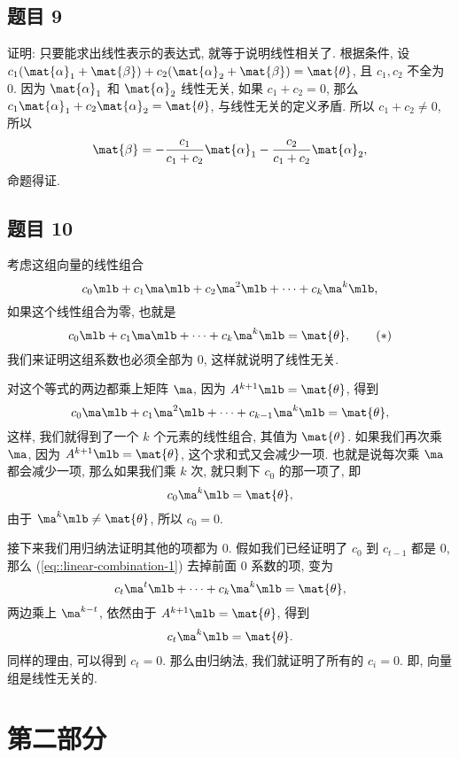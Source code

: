 \subsection*{ 题目 9 }
\begin{solution}
证明: 只要能求出线性表示的表达式, 就等于说明线性相关了. 根据条件, 设 $c_1 (\mat{\alpha}_1 + \mat{\beta}) + c_2 (\mat{\alpha}_2 + \mat{\beta}) = \mat{\theta}$, 且 $c_1, c_2$ 不全为 $0$. 因为 $\mat{\alpha}_1$ 和 $\mat{\alpha}_2$ 线性无关, 如果 $c_1 + c_2 = 0$, 那么 $c_1 \mat{\alpha}_1 + c_2 \mat{\alpha}_2 = \mat{\theta}$, 与线性无关的定义矛盾. 所以 $c_1 + c_2 \not= 0$, 所以
\[
\mat{\beta} = -\frac{c_1}{c_1 + c_2}\mat{\alpha}_1 - \frac{c_2}{c_1 + c_2}\mat{\alpha}_2,
\]
命题得证.
\end{solution}

\subsection*{ 题目 10 }
\begin{solution}
考虑这组向量的线性组合
\[
c_0 \mlb + c_1 \ma \mlb + c_2 \ma^2 \mlb + \cdots + c_k \ma^k \mlb,
\]
如果这个线性组合为零, 也就是
\[
\label{eq::linear-combination-1}
    c_0 \mlb + c_1 \ma \mlb + \cdots + c_k \ma^k \mlb = \mat{\theta}, \tag{$\ast$}
\]
我们来证明这组系数也必须全部为 $0$, 这样就说明了线性无关.

对这个等式的两边都乘上矩阵 $\ma$, 因为 $A^{k + 1}\mlb = \mat{\theta}$, 得到
\[
    c_0 \ma \mlb + c_1 \ma^2 \mlb + \cdots + c_{k - 1} \ma^k \mlb = \mat{\theta},
\]
这样, 我们就得到了一个 $k$ 个元素的线性组合, 其值为 $\mat{\theta}$. 如果我们再次乘 $\ma$, 因为 $A^{k + 1}\mlb = \mat{\theta}$, 这个求和式又会减少一项. 也就是说每次乘 $\ma$ 都会减少一项, 那么如果我们乘 $k$ 次, 就只剩下 $c_0$ 的那一项了, 即
\[
c_0 \ma^k \mlb = \mat{\theta},
\]
由于 $\ma^k \mlb \not= \mat{\theta}$, 所以 $c_0 = 0$.

接下来我们用归纳法证明其他的项都为 $0$. 假如我们已经证明了 $c_0$ 到 $c_{t - 1}$ 都是 $0$, 那么 (\ref{eq::linear-combination-1}) 去掉前面 $0$ 系数的项, 变为
\[
c_{t} \ma^t \mlb + \cdots + c_k \ma^k \mlb = \mat{\theta},
\]
两边乘上 $\ma^{k - t}$, 依然由于 $A^{k + 1}\mlb = \mat{\theta}$, 得到
\[
c_{t} \ma^k \mlb = \mat{\theta}.
\]
同样的理由, 可以得到 $c_t = 0$. 那么由归纳法, 我们就证明了所有的 $c_i = 0$. 即, 向量组是线性无关的.
\end{solution}

\newpage
\section{第二部分}

